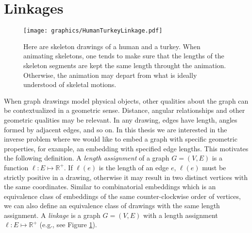 \documentclass[10pt]{CSUNthesis}
\theoremstyle{plain}%
\theoremstyle{definition}
\theoremstyle{remark}
\newcommand{\bbr}{{\mathbb{R}}}
\begin{document}
\section{Linkages}
\begin{figure}[!htbp]
 \begin{center}\label{fig:turkey}
  \texttt{[image: graphics/HumanTurkeyLinkage.pdf]}
  \caption{Here are skeleton drawings of a human and a turkey.  When animating skeletons, one tends to make sure that the lengths of the skeleton segments are kept the same length throught the animation.  Otherwise, the animation may depart from what is ideally understood of skeletal motions.}
 \end{center} 
\end{figure}

When graph drawings model physical objects, other qualities about the graph can be contextualized in a geometric sense.  
Distance, angular relationships and other geometric qualities may be relevant.
In any drawing, edges have length, angles formed by adjacent edges, and so on.  
In this thesis we are interested in the inverse problem where we would like to embed a graph with specific geometric properties, for example, an embedding with specified edge lengths. 
This motivates the following definition.
A \textit{length assignment} of a graph $G=(V,E)$ is a function $\ell:E \mapsto \bbr^+$. 
If $\ell(e)$ is the length of an edge $e$, $\ell(e)$ must be strictly positive in a drawing, otherwise it may result in two distinct vertices with the same coordinates.
Similar to combinatorial embeddings which is an equivalence class of embeddings of the same counter-clockwise order of vertices, we can also define an equivalence class of drawings with the same length assignment.
A \textit{linkage} is a graph $G = (V,E)$ with a length assignment $\ell:E \mapsto \bbr^+$ (e.g., see Figure \ref{fig:turkey}).




\end{document}
